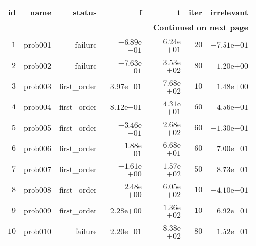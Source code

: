 \documentclass[varwidth=20cm,crop=true]{standalone}
\begin{document}
\begin{longtable}{rrrrrrr}
\hline
id & name & status & f & t & iter & irrelevant \\\hline
\endhead
\hline
\multicolumn{7}{r}{{\bfseries Continued on next page}}\\
\hline
\endfoot
\endlastfoot
\(     1\) & prob001 & failure & \(-6.89\)e\(-01\) & \( 6.24\)e\(+01\) & \(    20\) & \(-7.51\)e\(-01\) \\
\(     2\) & prob002 & failure & \(-7.63\)e\(-01\) & \( 3.53\)e\(+02\) & \(    80\) & \( 1.20\)e\(+00\) \\
\(     3\) & prob003 & first\_order & \( 3.97\)e\(-01\) & \( 7.68\)e\(+02\) & \(    10\) & \( 1.48\)e\(+00\) \\
\(     4\) & prob004 & first\_order & \( 8.12\)e\(-01\) & \( 4.31\)e\(+01\) & \(    60\) & \( 4.56\)e\(-01\) \\
\(     5\) & prob005 & first\_order & \(-3.46\)e\(-01\) & \( 2.68\)e\(+02\) & \(    60\) & \(-1.30\)e\(-01\) \\
\(     6\) & prob006 & first\_order & \(-1.88\)e\(-01\) & \( 6.68\)e\(+01\) & \(    60\) & \( 7.00\)e\(-01\) \\
\(     7\) & prob007 & first\_order & \(-1.61\)e\(+00\) & \( 1.57\)e\(+02\) & \(    50\) & \(-8.73\)e\(-01\) \\
\(     8\) & prob008 & first\_order & \(-2.48\)e\(+00\) & \( 6.05\)e\(+02\) & \(    10\) & \(-4.10\)e\(-01\) \\
\(     9\) & prob009 & first\_order & \( 2.28\)e\(+00\) & \( 1.36\)e\(+02\) & \(    10\) & \(-6.92\)e\(-01\) \\
\(    10\) & prob010 & failure & \( 2.20\)e\(-01\) & \( 8.38\)e\(+02\) & \(    80\) & \( 1.52\)e\(-01\) \\\hline
\end{longtable}
\end{document}
